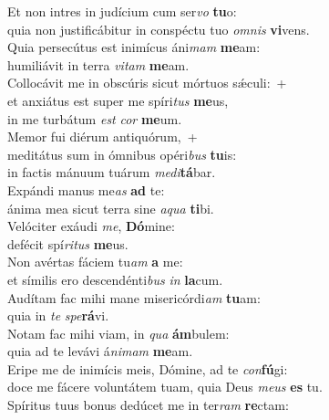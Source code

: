 \evenverse Et non intres in judícium cum ser\textit{vo} \textbf{tu}o:~\*\\
\evenverse quia non justificábitur in conspéctu tuo \textit{om}\textit{nis} \textbf{vi}vens.\\
\oddverse Quia persecútus est inimícus áni\textit{mam} \textbf{me}am:~\*\\
\oddverse humiliávit in terra \textit{vi}\textit{tam} \textbf{me}am.\\
\evenverse Collocávit me in obscúris sicut mórtuos sǽculi:~+\\
\evenverse  et anxiátus est super me spíri\textit{tus} \textbf{me}us,~\*\\
\evenverse in me turbátum \textit{est} \textit{cor} \textbf{me}um.\\
\oddverse Memor fui diérum antiquórum,~+\\
\oddverse  meditátus sum in ómnibus opéri\textit{bus} \textbf{tu}is:~\*\\
\oddverse in factis mánuum tuárum \textit{me}\textit{di}\textbf{tá}bar.\\
\evenverse Expándi manus me\textit{as} \textbf{ad} te:~\*\\
\evenverse ánima mea sicut terra sine \textit{a}\textit{qua} \textbf{ti}bi.\\
\oddverse Velóciter exáudi \textit{me}, \textbf{Dó}mine:~\*\\
\oddverse defécit spí\textit{ri}\textit{tus} \textbf{me}us.\\
\evenverse Non avértas fáciem tu\textit{am} \textbf{a} me:~\*\\
\evenverse et símilis ero descendénti\textit{bus} \textit{in} \textbf{la}cum.\\
\oddverse Audítam fac mihi mane misericórdi\textit{am} \textbf{tu}am:~\*\\
\oddverse quia in \textit{te} \textit{spe}\textbf{rá}vi.\\
\evenverse Notam fac mihi viam, in \textit{qua} \textbf{ám}bulem:~\*\\
\evenverse quia ad te levávi á\textit{ni}\textit{mam} \textbf{me}am.\\
\oddverse Eripe me de inimícis meis, Dómine, ad te \textit{con}\textbf{fú}gi:~\*\\
\oddverse doce me fácere voluntátem tuam, quia Deus \textit{me}\textit{us} \textbf{es} tu.\\
\evenverse Spíritus tuus bonus dedúcet me in ter\textit{ram} \textbf{re}ctam:~\*\\
